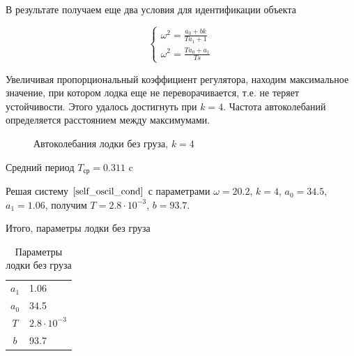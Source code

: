 \documentclass[12pt,a4paper]{article}
\begin{document}
В результате получаем еще два условия для идентификации объекта

\begin{equation*}
	\label{self_oscil_cond}
	\begin{cases}
		\omega^2 = \frac{a_0 + bk}{Ta_1 + 1}
		\\
		\omega^2 = \frac{Ta_0+a_1}{Ts}
	\end{cases}
\end{equation*}

Увеличивая пропорциональный коэффициент регулятора, находим максимальное значение, при котором лодка еще не переворачивается, т.е. не теряет устойчивости. Этого удалось достигнуть при $k = 4$. Частота автоколебаний определяется расстоянием между максимумами.

\begin{figure}[h]
	\caption{Автоколебания лодки без груза, $k = 4$}
\end{figure}

Средний период $T_{\text{ср}} = 0.311$ c

Решая систему $\ref{self_oscil_cond}$ с параметрами $\omega = 20.2$, $k = 4$, $a_0 = 34.5$, $a_1 = 1.06$, получим $T = 2.8 \cdot 10^{-3}$, $b = 93.7$.

Итого, параметры лодки без груза 

\begin{table}[h]
	\caption{Параметры лодки без груза}
	\label{table:boat_params_no_cargo}
	\begin{center}
		\begin{tabular}{cl}
			$a_1$ &  1.06 \\
			$a_0$ &  34.5 \\
			$T$ & $2.8 \cdot 10^{-3}$ \\
			$b$ & 93.7 \\
		\end{tabular}
	\end{center}
\end{table}
\end{document}
